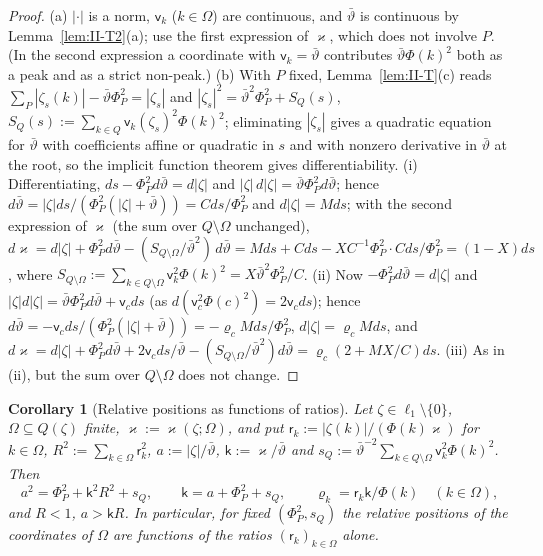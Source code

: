 \documentclass[10pt]{amsart}
\newtheorem{corollary}[theorem]{Corollary}
\theoremstyle{definition}
\theoremstyle{remark}
\begin{document}
\begin{proof}
(a) $|\cdot|$ is a norm, $\mathsf v_k$ ($k\in\Omega$) are continuous, and
$\bar\vartheta$ is continuous by Lemma~\ref{lem:II-T2}(a); use the first
expression of $\varkappa$, which does not involve $P$.  (In the second
expression a coordinate with $\mathsf v_k=\bar\vartheta$ contributes
$\bar\vartheta\Phi(k)^2$ both as a peak and as a strict non-peak.)
(b) With $P$ fixed, Lemma~\ref{lem:II-T}(c) reads
$\sum_P|\zeta_s(k)|-\bar\vartheta\Phi_P^2=|\zeta_s|$ and $|\zeta_s|^2=
\bar\vartheta^2\Phi_P^2+S_Q(s)$, $S_Q(s):=\sum_{k\in Q}\mathsf v_k(\zeta_s)^2
\Phi(k)^2$; eliminating $|\zeta_s|$ gives a quadratic equation for
$\bar\vartheta$ with coefficients affine or quadratic in $s$ and with nonzero
derivative in $\bar\vartheta$ at the root, so the implicit function theorem
gives differentiability.  (i) Differentiating, $ds-\Phi_P^2d\bar\vartheta=
d|\zeta|$ and $|\zeta|\,d|\zeta|=\bar\vartheta\Phi_P^2d\bar\vartheta$; hence
$d\bar\vartheta=|\zeta|ds/(\Phi_P^2(|\zeta|+\bar\vartheta))=Cds/\Phi_P^2$ and
$d|\zeta|=Mds$; with the second expression of $\varkappa$ (the sum over
$Q\setminus\Omega$ unchanged), $d\varkappa=d|\zeta|+\Phi_P^2d\bar\vartheta-
(S_{Q\setminus\Omega}/\bar\vartheta^2)\,d\bar\vartheta=Mds+Cds-XC^{-1}\Phi_P^2\cdot
Cds/\Phi_P^2=(1-X)ds$, where $S_{Q\setminus\Omega}:=\sum_{k\in Q\setminus
\Omega}\mathsf v_k^2\Phi(k)^2=X\bar\vartheta^2\Phi_P^2/C$.  (ii) Now $-\Phi_P^2d\bar\vartheta=d|\zeta|$ and
$|\zeta|d|\zeta|=\bar\vartheta\Phi_P^2d\bar\vartheta+\mathsf v_cds$ (as
$d(\mathsf v_c^2\Phi(c)^2)=2\mathsf v_cds$); hence $d\bar\vartheta=-\mathsf
v_cds/(\Phi_P^2(|\zeta|+\bar\vartheta))=-\varrho_cMds/\Phi_P^2$,
$d|\zeta|=\varrho_cMds$, and $d\varkappa=d|\zeta|+\Phi_P^2d\bar\vartheta+
2\mathsf v_cds/\bar\vartheta-(S_{Q\setminus\Omega}/\bar\vartheta^2)d\bar\vartheta
=\varrho_c(2+MX/C)ds$.  (iii) As in (ii), but the sum over
$Q\setminus\Omega$ does not change.
\end{proof}

\begin{corollary}[Relative positions as functions of ratios]\label{cor:II-Rkt}
Let $\zeta\in\ell_1\setminus\{0\}$, $\Omega\subseteq Q(\zeta)$ finite,
$\varkappa:=\varkappa(\zeta;\Omega)$, and put $\mathsf r_k:=|\zeta(k)|/(\Phi(k)
\varkappa)$ for $k\in\Omega$, $R^2:=\sum_{k\in\Omega}\mathsf r_k^2$,
$a:=|\zeta|/\bar\vartheta$, $\mathsf k:=\varkappa/\bar\vartheta$ and
$s_Q:=\bar\vartheta^{-2}\sum_{k\in Q\setminus\Omega}\mathsf v_k^2\Phi(k)^2$.  Then
\[
 a^2=\Phi_P^2+\mathsf k^2R^2+s_Q,\qquad \mathsf k=a+\Phi_P^2+s_Q,\qquad
 \varrho_k=\mathsf r_k\mathsf k/\Phi(k)\quad(k\in\Omega),
\]
and $R<1$, $a>\mathsf kR$.  In particular, for fixed $(\Phi_P^2,s_Q)$ the
relative positions of the coordinates of $\Omega$ are functions of the ratios
$(\mathsf r_k)_{k\in\Omega}$ alone.
\end{corollary}
\end{document}
